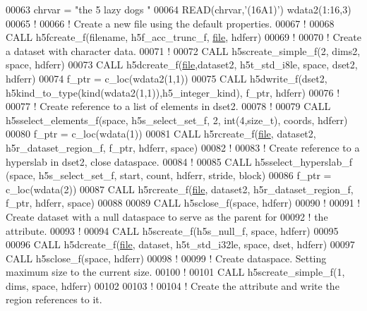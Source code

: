 \begin{DoxyCode}
00063   chrvar = \textcolor{stringliteral}{"the 5 lazy dogs "}
00064   \textcolor{keyword}{READ}(chrvar,\textcolor{stringliteral}{'(16A1)'}) wdata2(1:16,3)
00065   \textcolor{comment}{!}
00066   \textcolor{comment}{! Create a new file using the default properties.}
00067   \textcolor{comment}{!}
00068   \textcolor{keyword}{CALL }h5fcreate\_f(filename, h5f\_acc\_trunc\_f, \hyperlink{structfile}{file}, hdferr)
00069   \textcolor{comment}{!}
00070   \textcolor{comment}{! Create a dataset with character data.}
00071   \textcolor{comment}{!}
00072   \textcolor{keyword}{CALL }h5screate\_simple\_f(2, dims2, space, hdferr)
00073   \textcolor{keyword}{CALL }h5dcreate\_f(\hyperlink{structfile}{file},dataset2, h5t\_std\_i8le, space, dset2, hdferr)
00074   f\_ptr = c\_loc(wdata2(1,1))
00075   \textcolor{keyword}{CALL }h5dwrite\_f(dset2, h5kind\_to\_type(kind(wdata2(1,1)),h5\_integer\_kind), f\_ptr, hdferr)
00076   \textcolor{comment}{!}
00077   \textcolor{comment}{! Create reference to a list of elements in dset2.}
00078   \textcolor{comment}{!}
00079   \textcolor{keyword}{CALL }h5sselect\_elements\_f(space, h5s\_select\_set\_f, 2, int(4,size\_t), coords, hdferr)
00080   f\_ptr = c\_loc(wdata(1))
00081   \textcolor{keyword}{CALL }h5rcreate\_f(\hyperlink{structfile}{file}, dataset2, h5r\_dataset\_region\_f, f\_ptr, hdferr, space)
00082   \textcolor{comment}{!}
00083   \textcolor{comment}{! Create reference to a hyperslab in dset2, close dataspace.}
00084   \textcolor{comment}{!}
00085   \textcolor{keyword}{CALL }h5sselect\_hyperslab\_f (space, h5s\_select\_set\_f, start, count, hdferr, stride, block)
00086   f\_ptr = c\_loc(wdata(2))
00087   \textcolor{keyword}{CALL }h5rcreate\_f(\hyperlink{structfile}{file}, dataset2, h5r\_dataset\_region\_f, f\_ptr, hdferr, space)
00088 
00089   \textcolor{keyword}{CALL }h5sclose\_f(space, hdferr)
00090   \textcolor{comment}{!}
00091   \textcolor{comment}{! Create dataset with a null dataspace to serve as the parent for}
00092   \textcolor{comment}{! the attribute.}
00093   \textcolor{comment}{!}
00094   \textcolor{keyword}{CALL }h5screate\_f(h5s\_null\_f, space, hdferr)
00095   
00096   \textcolor{keyword}{CALL }h5dcreate\_f(\hyperlink{structfile}{file}, dataset, h5t\_std\_i32le, space, dset, hdferr)
00097   \textcolor{keyword}{CALL }h5sclose\_f(space, hdferr)
00098   \textcolor{comment}{!}
00099   \textcolor{comment}{! Create dataspace.  Setting maximum size to the current size.}
00100   \textcolor{comment}{!}
00101   \textcolor{keyword}{CALL }h5screate\_simple\_f(1, dims, space, hdferr)
00102 
00103   \textcolor{comment}{!}
00104   \textcolor{comment}{! Create the attribute and write the region references to it.}

\end{DoxyCode}
